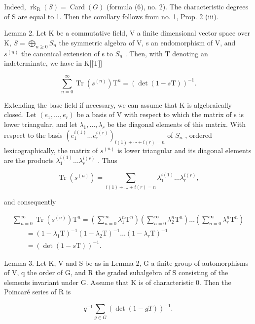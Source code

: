 Indeed, \(\operatorname{rk}_{\mathrm{R}}(S) = \operatorname{Card}(G)\) (formula (6), no. 2). The characteristic degrees of S are equal to 1. Then the corollary follows from no. 1, Prop. 2 (iii).

Lemma 2. Let K be a commutative field, V a finite dimensional vector space over K, \(S = \bigoplus_{n \geqslant 0} S_n\) the symmetric algebra of V, s an endomorphism of V, and \(s^{(n)}\) the canonical extension of s to \(S_n\) . Then, with T denoting an indeterminate, we have in K{[}{[}T{]}{]}

\[
\sum_ {n = 0} ^ {\infty} \operatorname{Tr} (s ^ {(n)}) \mathrm{T} ^ {n} = (\det (1 - s \mathrm{T})) ^ {- 1}.
\]

Extending the base field if necessary, we can assume that K is algebraically closed. Let \((e_{1},\ldots,e_{r})\) be a basis of V with respect to which the matrix of s is lower triangular, and let \(\lambda_{1},\ldots,\lambda_{r}\) be the diagonal elements of this matrix. With respect to the basis \((e_{1}^{i(1)}\ldots e_{r}^{i(r)})_{i(1)+\cdots+i(r)=n}\) of \(S_{n}\) , ordered lexicographically, the matrix of \(s^{(n)}\) is lower triangular and its diagonal elements are the products \(\lambda_{1}^{i(1)}\ldots\lambda_{r}^{i(r)}\) . Thus

\[
\operatorname{Tr} \left(s ^ {(n)}\right) = \sum_ {i (1) + \dots + i (r) = n} \lambda_ {1} ^ {i (1)} \dots \lambda_ {r} ^ {i (r)},
\]

and consequently

\[
\begin{array}{l} \sum_ {n = 0} ^ {\infty} \operatorname{Tr} (s ^ {(n)}) \mathrm{T} ^ {n} = \left(\sum_ {n = 0} ^ {\infty} \lambda_ {1} ^ {n} \mathrm{T} ^ {n}\right) \left(\sum_ {n = 0} ^ {\infty} \lambda_ {2} ^ {n} \mathrm{T} ^ {n}\right) \ldots \left(\sum_ {n = 0} ^ {\infty} \lambda_ {r} ^ {n} \mathrm{T} ^ {n}\right) \\ \qquad = (1 - \lambda_ {1} \mathrm{T}) ^ {- 1} (1 - \lambda_ {2} \mathrm{T}) ^ {- 1} \ldots (1 - \lambda_ {r} \mathrm{T}) ^ {- 1} \\ \qquad = (\det (1 - s \mathrm{T})) ^ {- 1}. \end{array}
\]

Lemma 3. Let K, V and S be as in Lemma 2, G a finite group of automorphisms of V, q the order of G, and R the graded subalgebra of S consisting of the elements invariant under G. Assume that K is of characteristic 0. Then the Poincaré series of R is

\[
q ^ {- 1} \sum_ {g \in G} (\det (1 - g T)) ^ {- 1}.
\]

